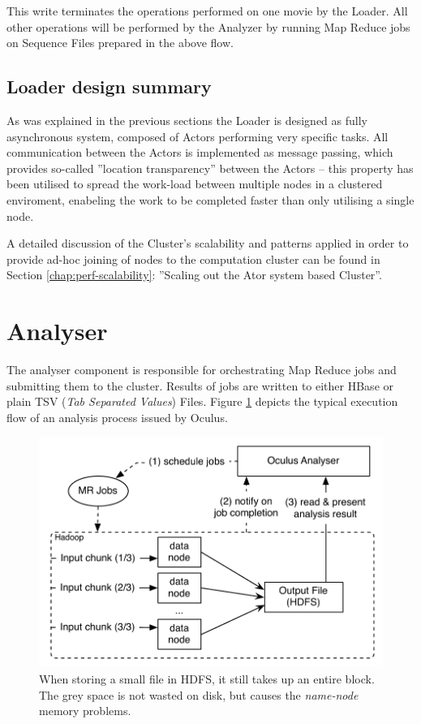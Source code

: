 This write terminates the operations performed on one movie by the Loader. All other operations will be performed by the Analyzer by running Map Reduce jobs on Sequence Files prepared in the above flow.

\subsection{Loader design summary}
As was explained in the previous sections the Loader is designed as fully asynchronous system, composed of Actors performing very specific tasks. All communication between the Actors is implemented as message passing, which provides so-called ''location transparency'' between the Actors -- this property has been utilised to spread the work-load between multiple nodes in a clustered enviroment, enabeling the work to be completed faster than only utilising a single node.

A detailed discussion of the Cluster's scalability and patterns applied in order to provide ad-hoc joining of nodes to the computation cluster can be found in Section \ref{chap:perf-scalability}: ''Scaling out the Ator system based Cluster''.

\section{Analyser}
\label{sec:analyser}
The analyser component is responsible for orchestrating Map Reduce jobs and submitting them to the cluster. Results of jobs are written to either HBase or plain TSV (\textit{Tab Separated Values}) Files. Figure \ref{fig:analyser-high-level} depicts the typical execution flow of an analysis process issued by Oculus.

\begin{figure}[ch!]
  \centering
  \includegraphics[scale=0.9]{diagrams/analyser-high-level.pdf}
  \caption{When storing a small file in HDFS, it still takes up an entire block. The grey space is not wasted on disk, but causes the \textit{name-node} memory problems.}
  \label{fig:analyser-high-level}
\end{figure}

